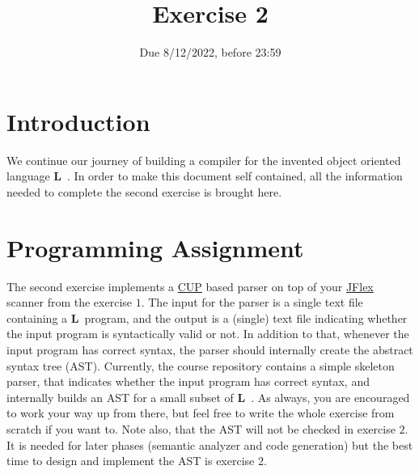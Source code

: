 \documentclass{article}
\begin{document}
\title{Exercise 2}


\date{Due 8/12/2022, before 23:59}

\maketitle

\newcommand{\plname}{\textbf{L}\ }

\section{Introduction}
We continue our journey of building a compiler
for the invented object oriented language \plname.
In order to make this document self contained,
all the information needed to complete the second exercise is brought here.
\section{Programming Assignment}
The second exercise implements a \href{http://www2.cs.tum.edu/projects/cup/}{CUP} based
parser on top of your \href{http://jflex.de/}{JFlex} scanner from the exercise $1$.
The input for the parser is a single text file containing a \plname program,
and the output is a (single) text file indicating whether the input program
is syntactically valid or not. In addition to that,
whenever the input program has correct syntax,
the parser should internally create the abstract syntax tree (AST).
Currently, the course repository contains a simple skeleton
parser, that indicates whether the input program has correct syntax,
and internally builds an AST for a small subset of \plname.
As always, you are encouraged to work your way up from there,
but feel free to write the whole exercise from scratch if you want to.
Note also, that the AST will not be checked in exercise $2$.
It is needed for later phases (semantic analyzer and code generation)
but the best time to design and implement the AST is exercise $2$.
\end{document}
